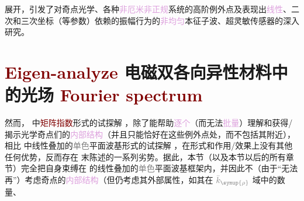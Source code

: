 展开\cite{xieAnalytic3DVector}，引发了对\textcolor{NavyBlue}{奇点光学}\cite{berryOpticalSingularitiesBirefringent2003,berryOpticalSingularitiesBianisotropic2005,kirillovUnfoldingEigenvalueSurfaces2005}、各种\textcolor{Plum}{非厄米}\cite{yangNonabelianPhysicsLight2024}\textcolor{Plum}{非正规}\cite{wiersigDistanceExceptionalPoints2022}系统的高阶\textcolor{PineGreen}{例外点}\cite{mackayExceptionalGuidedWaves2021,wiersigMovingExceptionalSurface2023}及表现出\textcolor{Plum}{线性}、二次和三次坐标（等参数）依赖的\textcolor{PineGreen}{振幅}行为的\textcolor{Plum}{非均匀}\textcolor{PineGreen}{本征子波}\cite{lakhtakiaElectromagneticSurfaceWaves2020,gerardinConditionsVoigtWave2001,borzdovWavesLinearQuadratic1996,sturmElectromagneticWavesCrystals2024,sturmPropagationElectromagneticWaves}、超灵敏传感器\cite{wiersigReviewExceptionalPointbased2020,wiersigMovingExceptionalSurface2023}的深入研究。

\vspace*{-6.5em}

\section{\textcolor{Maroon}{Eigen-analyze} 电磁双各向异性材料中的光场 \textcolor{Maroon}{Fourier spectrum}}\label{sec:eigen-analysis}

然而， 中\textcolor{Maroon}{矩阵指数}形式的试探解 ，除了能帮助\textcolor{Plum}{逐个}（而无法\textcolor{Plum}{批量}）理解和获得/揭示\textcolor{PineGreen}{光学奇点}们的\textcolor{Plum}{内部结构}（并且只能恰好在这些\textcolor{PineGreen}{例外点}处，而不包括其附近），相比  中\textcolor{PineGreen}{线性叠加的\textcolor{gray}{单色}平面波基}形式的试探解 ，在形式和作用/效果上没有其他任何优势，反而存在  末陈述的一系列劣势。据此，本节（以及本节以后的所有章节）完全把自身束缚在  的\textcolor{PineGreen}{线性叠加的\textcolor{gray}{单色}平面波基}框架内，并因此不（由于“无法再”）考虑奇点的\textcolor{Plum}{内部结构}（但仍考虑其外部属性，如其在 $\mathcolor{gray}{\bar{k}_{\symup{\rho}}}$ 域中的数量、

